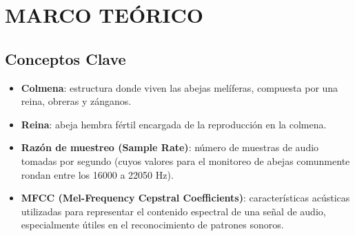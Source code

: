 \documentclass[12pt]{report}
\newenvironment{tightmulticols}{%
  \begin{multicols}{2}
  \setlength{\parskip}{0pt}
  \setlength{\parindent}{0em}
  \linespread{1}\selectfont
}{%
  \end{multicols}
}
\begin{document}

\pagebreak
\chapter{MARCO TEÓRICO}
\vspace{-3em}

\begin{tightmulticols}


\section{Conceptos Clave}

\begin{itemize}
    \item[\ding{43}] \textbf{Colmena}: estructura donde viven las abejas melíferas, compuesta por una reina, obreras y zánganos.
	\item[\ding{43}] \textbf{Reina}: abeja hembra fértil encargada de la reproducción en la colmena.
	\item[\ding{43}] \textbf{Razón de muestreo (Sample Rate)}: número de muestras de audio tomadas por segundo (cuyos valores para el monitoreo de abejas comunmente rondan entre los 16000 a 22050 Hz).
	\item[\ding{43}] \textbf{MFCC (Mel-Frequency Cepstral Coefficients)}: características acústicas utilizadas para representar el contenido espectral de una señal de audio, especialmente útiles en el reconocimiento de patrones sonoros.
\end{itemize}




\end{tightmulticols}
\end{document}
